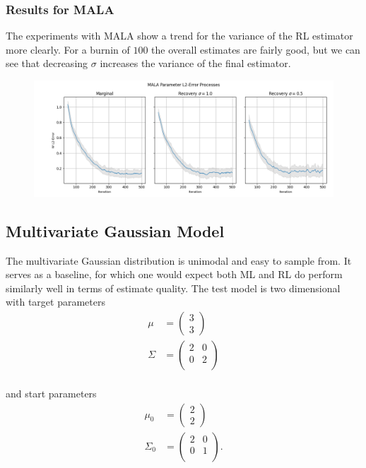 \subsubsection{Results for MALA}

The experiments with MALA show a trend for the variance of the RL estimator more clearly.
For a burnin of $100$ the overall estimates are fairly good, but we can see that decreasing $\sigma$ increases the variance of the final estimator.

\begin{figure}[H]
  	\centering
  	\includegraphics[width=0.85\linewidth]{assets/figures/POLY_MALA_pro100.png}
\end{figure}






\subsection{Multivariate Gaussian Model}

The multivariate Gaussian distribution is unimodal and easy to sample from. 
It serves as a baseline, for which one would expect both ML and RL do perform similarly well in terms of estimate quality.
The test model is two dimensional with target parameters
\[
\begin{aligned}
	\mu &= \begin{pmatrix} 3 \\ 3 \end{pmatrix} \\
	\Sigma &= 
	\begin{pmatrix}
		2 & 0 \\
		0 & 2 \\
	\end{pmatrix} \\
\end{aligned}
\]

and start parameters
\[
\begin{aligned}
	\mu_0 &= \begin{pmatrix} 2 \\ 2 \end{pmatrix} \\
	\Sigma_0 &= 
	\begin{pmatrix}
		2 & 0 \\
		0 & 1 \\
	\end{pmatrix}. \\
\end{aligned}
\]


